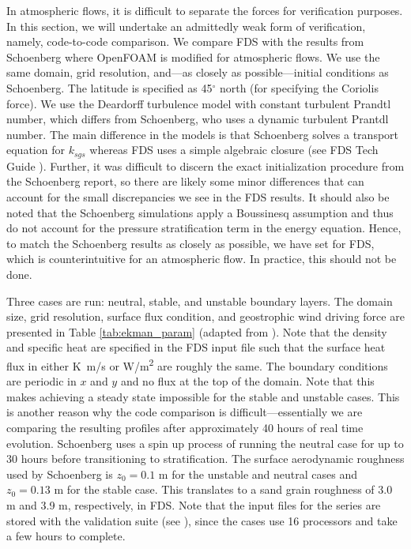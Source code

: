 \documentclass[11pt]{book}
\begin{document}
In atmospheric flows, it is difficult to separate the forces for verification purposes.  In this section, we will undertake an admittedly weak form of verification, namely, code-to-code comparison.  We compare FDS with the results from Schoenberg \cite{Schoenberg:2004} where OpenFOAM is modified for atmospheric flows.  We use the same domain, grid resolution, and---as closely as possible---initial conditions as Schoenberg.  The latitude is specified as 45$^\circ$ north (for specifying the Coriolis force).  We use the Deardorff turbulence model with constant turbulent Prandtl number, which differs from Schoenberg, who uses a dynamic turbulent Prantdl number.  The main difference in the models is that Schoenberg solves a transport equation for $k_{sgs}$ whereas FDS uses a simple algebraic closure (see FDS Tech Guide \cite{FDS_Math_Guide}).  Further, it was difficult to discern the exact initialization procedure from the Schoenberg report, so there are likely some minor differences that can account for the small discrepancies we see in the FDS results.  It should also be noted that the Schoenberg simulations apply a Boussinesq assumption and thus do not account for the pressure stratification term in the energy equation.  Hence, to match the Schoenberg results as closely as possible, we have set  for FDS, which is counterintuitive for an atmospheric flow.  In practice, this should not be done.

Three cases are run: neutral, stable, and unstable boundary layers.  The domain size, grid resolution, surface flux condition, and geostrophic wind driving force are presented in Table \ref{tab:ekman_param} (adapted from \cite{Schoenberg:2004}). Note that the density and specific heat are specified in the FDS input file such that the surface heat flux in either \si{K.m/s} or \si{W/m^2} are roughly the same.  The boundary conditions are periodic in $x$ and $y$ and no flux at the top of the domain.  Note that this makes achieving a steady state impossible for the stable and unstable cases.  This is another reason why the code comparison is difficult---essentially we are comparing the resulting profiles after approximately 40 hours of real time evolution.  Schoenberg uses a spin up process of running the neutral case for up to 30 hours before transitioning to stratification.  The surface aerodynamic roughness used by Schoenberg is $z_0 = 0.1$ m for the unstable and neutral cases and $z_0 = 0.13$ m for the stable case.  This translates to a sand grain roughness of 3.0 m and 3.9 m, respectively, in FDS.  Note that the input files for the  series are stored with the validation suite (see ), since the cases use 16 processors and take a few hours to complete.
\end{document}
